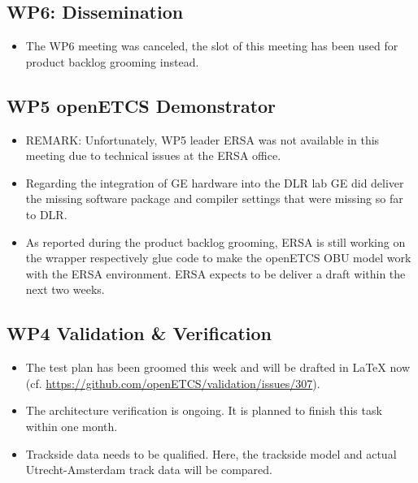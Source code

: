 \documentclass[a4paper, 11pt]{article}
\begin{document}
\subsection{WP6: Dissemination}
\begin{itemize}
\item The WP6 meeting was canceled, the slot of this meeting has been used for product backlog grooming instead.
\end{itemize}

\subsection{WP5 openETCS Demonstrator}
\begin{itemize}
\item REMARK: Unfortunately, WP5 leader ERSA was not available in this meeting due to technical issues at the ERSA office.
\item Regarding the integration of GE hardware into the DLR lab GE did deliver the missing software package and compiler settings that were missing so far to DLR.
\item As reported during the product backlog grooming, ERSA is still working on the wrapper respectively glue code to make the openETCS OBU model work with the ERSA environment. ERSA expects to be deliver a draft within the next two weeks.
\end{itemize}

\subsection{WP4 Validation \& Verification}
\begin{itemize}
\item The test plan has been groomed this week and will be drafted in LaTeX now (cf. \url{https://github.com/openETCS/validation/issues/307}).
\item The architecture verification is ongoing. It is planned to finish this task within one month.
\item Trackside data needs to be qualified. Here, the trackside model and actual Utrecht-Amsterdam track data will be compared.
\end{itemize}
\end{document}
